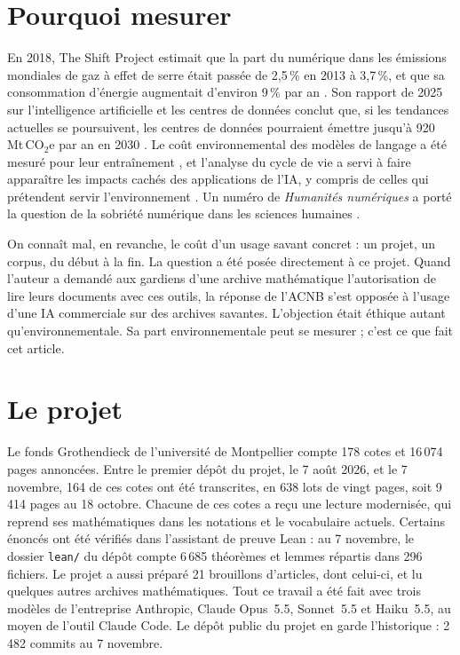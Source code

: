 \documentclass[11pt,a4paper]{article}
\begin{document}
\section{Pourquoi mesurer}

En 2018, The Shift Project estimait que la part du numérique dans les émissions mondiales de gaz à effet de serre était passée de 2,5\,\% en 2013 à 3,7\,\%, et que sa consommation d'énergie augmentait d'environ 9\,\% par an \citep{shift2018}. Son rapport de 2025 sur l'intelligence artificielle et les centres de données conclut que, si les tendances actuelles se poursuivent, les centres de données pourraient émettre jusqu'à 920\,Mt\,CO$_2$e par an en 2030 \citep{shift2025}. Le coût environnemental des modèles de langage a été mesuré pour leur entraînement \citep{luccioni2023,morand2026}, et l'analyse du cycle de vie a servi à faire apparaître les impacts cachés des applications de l'IA, y compris de celles qui prétendent servir l'environnement \citep{ligozat2022}. Un numéro de \emph{Humanités numériques} a porté la question de la sobriété numérique dans les sciences humaines \citep{baillot2025}.

On connaît mal, en revanche, le coût d'un usage savant concret : un projet, un corpus, du début à la fin. La question a été posée directement à ce projet. Quand l'auteur a demandé aux gardiens d'une archive mathématique l'autorisation de lire leurs documents avec ces outils, la réponse de l'ACNB s'est opposée à l'usage d'une IA commerciale sur des archives savantes. L'objection était éthique autant qu'environnementale. Sa part environnementale peut se mesurer ; c'est ce que fait cet article.

\section{Le projet}

Le fonds Grothendieck de l'université de Montpellier compte 178 cotes et 16\,074 pages annoncées. Entre le premier dépôt du projet, le 7 août 2026, et le 7 novembre, 164 de ces cotes ont été transcrites, en 638 lots de vingt pages, soit 9\,414 pages au 18 octobre. Chacune de ces cotes a reçu une lecture modernisée, qui reprend ses mathématiques dans les notations et le vocabulaire actuels. Certains énoncés ont été vérifiés dans l'assistant de preuve Lean : au 7 novembre, le dossier \texttt{lean/} du dépôt compte 6\,685 théorèmes et lemmes répartis dans 296 fichiers. Le projet a aussi préparé 21 brouillons d'articles, dont celui-ci, et lu quelques autres archives mathématiques. Tout ce travail a été fait avec trois modèles de l'entreprise Anthropic, Claude Opus~5.5, Sonnet~5.5 et Haiku~5.5, au moyen de l'outil Claude Code. Le dépôt public du projet en garde l'historique : 2\,482 commits au 7 novembre.
\end{document}

